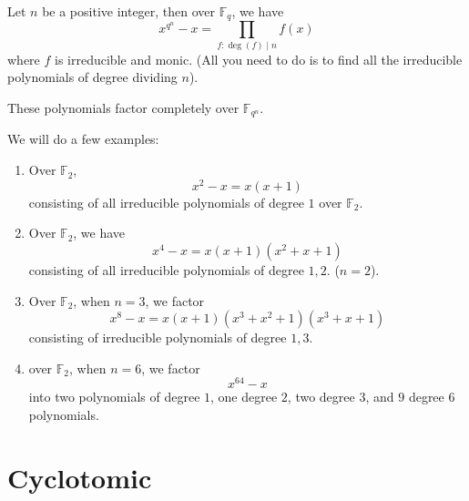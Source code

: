 \documentclass[openany]{book}
\newcommand{\F}{\mathbb{F}}
\begin{document}
\begin{prop}
    Let $n$ be a positive integer, then over $\F_q$, we have 
    \begin{equation*}
        x^{q^n}-x=\prod_{f: \deg(f)\mid n}f(x)
    \end{equation*}
    where $f$ is irreducible and monic. (All you need to do is to find all the irreducible polynomials of degree dividing $n$).

    These polynomials factor completely over $\F_{q^n}$.
\end{prop}


\begin{example}
    We will do a few examples: 
    \begin{enumerate}
        \item Over $\F_2$, 
        \begin{equation*}
            x^2-x=x(x+1)
        \end{equation*}
        consisting of all irreducible polynomials of degree $1$ over $\F_2$.
        \item Over $\F_2$, we have 
        \begin{equation*}
            x^4-x=x(x+1)(x^2+x+1)
        \end{equation*}
        consisting of all irreducible polynomials of degree $1,2$. ($n=2$).
        \item Over $\F_2$, when $n=3$, we factor 
        \begin{equation*}
            x^8-x=x(x+1)(x^3+x^2+1)(x^3+x+1)
        \end{equation*}
        consisting of irreducible polynomials of degree $1,3$.
        \item over $\F_2$, when $n=6$, we factor 
        \begin{equation*}
            x^{64}-x
        \end{equation*}
        into two polynomials of degree $1$, one degree $2$, two degree $3$, and $9$ degree $6$ polynomials.
    \end{enumerate}
\end{example}

\section{Cyclotomic}

\end{document}

